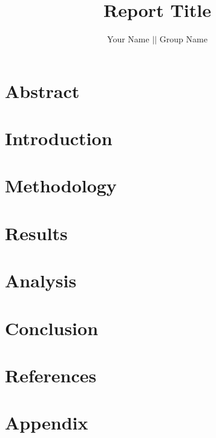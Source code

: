 \documentclass{labreport}
\title{Report Title}
\author{Your Name $||$ Group Name}
\begin{document}
\maketitle

\section[skipnum]{Abstract}

\tableofcontents\clearpage

\section{Introduction}



\clearpage

\section{Methodology}



\clearpage

\section{Results}



\clearpage

\section{Analysis}



\clearpage

\section{Conclusion}



\clearpage

\section{References}
\printbibliography
\clearpage

\section[skipnum]{Appendix}
\end{document}
